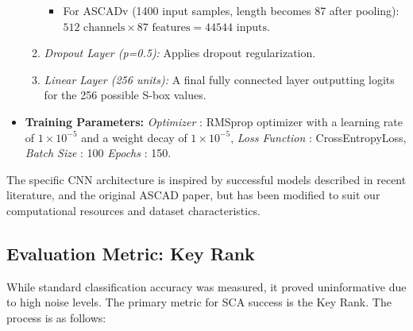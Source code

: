\documentclass[runningheads]{llncs}
\begin{document}
\begin{itemize}
\begin{enumerate}
\begin{itemize}
                \item For ASCADv (1400 input samples, length becomes 87 after pooling): $512 \text{ channels} \times 87 \text{ features} = 44544 \text{ inputs}$.
            \end{itemize}
            \item \textit{Dropout Layer (p=0.5):} Applies dropout regularization.
            \item \textit{Linear Layer (256 units):} A final fully connected layer outputting logits for the 256 possible S-box values.
        \end{enumerate}
    \item \textbf{Training Parameters:}
        \textit{Optimizer} : RMSprop optimizer with a learning rate of $1 \times 10^{-5}$ and a weight decay of $1 \times 10^{-5}$, \textit{Loss Function} : CrossEntropyLoss, \textit{Batch Size} : 100 \textit{Epochs} : 150.
\end{itemize}

The specific CNN architecture is inspired by successful models described in recent literature, and the original ASCAD paper, but has been modified to suit our computational resources and dataset characteristics.

\subsection{Evaluation Metric: Key Rank}
While standard classification accuracy was measured, it proved uninformative due to high noise levels. The primary metric for SCA success is the Key Rank.\cite{picek2019curse} The process is as follows:
\end{document}
